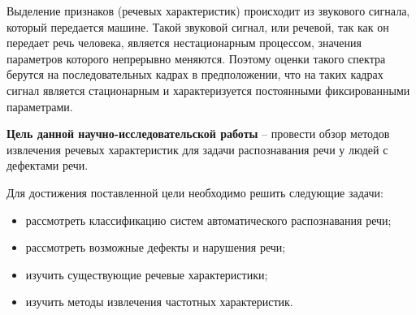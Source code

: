 Выделение признаков (речевых характеристик) происходит из звукового сигнала, который передается машине. Такой звуковой сигнал, или речевой, так как он передает речь человека, является нестационарным процессом, значения параметров которого непрерывно меняются. Поэтому оценки такого спектра берутся на последовательных кадрах в предположении, что на таких кадрах сигнал является стационарным и характеризуется постоянными фиксированными параметрами. \cite{spektr}



\textbf{Цель данной научно-исследовательской работы} -- провести обзор методов извлечения речевых характеристик для задачи распознавания речи у людей с дефектами речи.

Для достижения поставленной цели необходимо решить следующие задачи:
\begin{itemize}
	\item рассмотреть классификацию систем автоматического распознавания речи;
	\item рассмотреть возможные дефекты и нарушения речи;
	\item изучить существующие речевые характеристики;
	\item изучить методы извлечения частотных характеристик.
\end{itemize}


